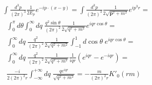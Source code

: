 \documentclass[11pt]{article}
\begin{document}
\begin{equation}
\begin{split}
& \int \frac{d^3p}{(2 \pi)^3} \frac{1}{2 E_p} e^{-i p \cdot (x - y)} =
  \int \frac{d^3p}{(2 \pi)^3} \frac{1}{2 \sqrt{\mathbf{p}^2 + m^2}}
    e^{i p^3 r } = \\
& \; \; \int_0^\pi d\theta \int_0^\infty dq \;
  \frac{q^2 \sin{\theta}}{(2 \pi)^2} \frac{1}{2 \sqrt{q^2 + m^2}}
  e^{i q r \cos{\theta} } = \\
& \; \; \int_0^\infty dq \;
  \frac{q^2}{(2 \pi)^2} \frac{1}{2 \sqrt{q^2 + m^2}}
  \int_{-1}^1 d\cos{\theta} \; e^{i q r \cos{\theta} } = \\
& \; \; \int_0^\infty dq \;
  \frac{q^2}{(2 \pi)^2} \frac{1}{2 \sqrt{q^2 + m^2}}
  \frac{1}{i q r} \left( e^{iqr} - e^{-iqr} \right) = \\
& \; \; \frac{-i}{2 (2 \pi)^2 r} \int_{-\infty}^{+\infty} dq \;
  \frac{q e^{iqr}}{\sqrt{q^2 + m^2}} =
-\frac{m}{(2 \pi)^2 r} K'_0(rm)
\end{split}
\end{equation}
\end{document}
